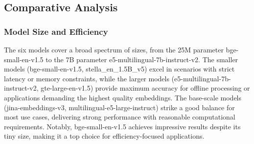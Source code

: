 \subsection{Comparative Analysis}\label{subsec:comparative-analysis}

\subsubsection{Model Size and Efficiency}
The six models cover a broad spectrum of sizes, from the 25M parameter bge-small-en-v1.5 to the 7B parameter e5-multilingual-7b-instruct-v2. The smaller models (bge-small-en-v1.5, stella\_en\_1.5B\_v5) excel in scenarios with strict latency or memory constraints, while the larger models (e5-multilingual-7b-instruct-v2, gte-large-en-v1.5) provide maximum accuracy for offline processing or applications demanding the highest quality embeddings.
The base-scale models (jina-embeddings-v3, multilingual-e5-large-instruct) strike a good balance for most use cases, delivering strong performance with reasonable computational requirements. Notably, bge-small-en-v1.5 achieves impressive results despite its tiny size, making it a top choice for efficiency-focused applications.


\begin{table}[ht!]
    \centering
    \noindent
    \caption{Comparison of Embedding Models}
    \label{tab:comparison-embeddings}
\end{table}

